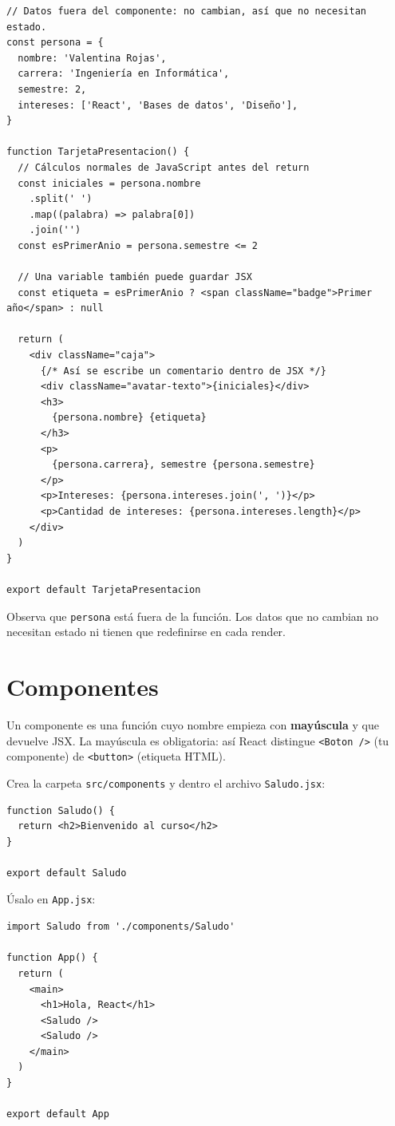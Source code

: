 \documentclass[11pt,a4paper]{article}
\newcommand{\cmd}[1]{\texttt{\color{reactdark}#1}}
\begin{document}
\begin{lstlisting}[language=JSX,title={\small\ttfamily src/components/jsx/TarjetaPresentacion.jsx}]
// Datos fuera del componente: no cambian, así que no necesitan estado.
const persona = {
  nombre: 'Valentina Rojas',
  carrera: 'Ingeniería en Informática',
  semestre: 2,
  intereses: ['React', 'Bases de datos', 'Diseño'],
}

function TarjetaPresentacion() {
  // Cálculos normales de JavaScript antes del return
  const iniciales = persona.nombre
    .split(' ')
    .map((palabra) => palabra[0])
    .join('')
  const esPrimerAnio = persona.semestre <= 2

  // Una variable también puede guardar JSX
  const etiqueta = esPrimerAnio ? <span className="badge">Primer año</span> : null

  return (
    <div className="caja">
      {/* Así se escribe un comentario dentro de JSX */}
      <div className="avatar-texto">{iniciales}</div>
      <h3>
        {persona.nombre} {etiqueta}
      </h3>
      <p>
        {persona.carrera}, semestre {persona.semestre}
      </p>
      <p>Intereses: {persona.intereses.join(', ')}</p>
      <p>Cantidad de intereses: {persona.intereses.length}</p>
    </div>
  )
}

export default TarjetaPresentacion
\end{lstlisting}

Observa que \cmd{persona} está fuera de la función. Los datos que no cambian no necesitan estado ni tienen que redefinirse en cada render.

\section{Componentes}

Un componente es una función cuyo nombre empieza con \textbf{mayúscula} y que devuelve JSX. La mayúscula es obligatoria: así React distingue \cmd{<Boton />} (tu componente) de \cmd{<button>} (etiqueta HTML).

Crea la carpeta \cmd{src/components} y dentro el archivo \cmd{Saludo.jsx}:
\begin{lstlisting}[language=JSX,title={\small\ttfamily src/components/Saludo.jsx}]
function Saludo() {
  return <h2>Bienvenido al curso</h2>
}

export default Saludo
\end{lstlisting}

Úsalo en \cmd{App.jsx}:
\begin{lstlisting}[language=JSX,title={\small\ttfamily src/App.jsx}]
import Saludo from './components/Saludo'

function App() {
  return (
    <main>
      <h1>Hola, React</h1>
      <Saludo />
      <Saludo />
    </main>
  )
}

export default App
\end{lstlisting}
\end{document}
